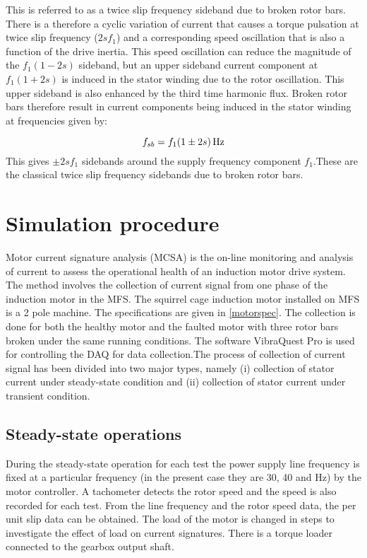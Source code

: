 \documentclass[a4paper,11pt]{report}
\begin{document}
This is referred to as a twice slip frequency sideband due to broken rotor bars. There is a therefore a cyclic variation of current that causes a torque pulsation at twice slip frequency ($2sf_{1}$) and a corresponding speed oscillation that is also a function of the drive inertia. This speed oscillation can reduce the magnitude of the $f_{1}(1-2s)$ sideband, but an upper sideband current component at $f_{1}(1+2s)$ is induced in the stator winding due to the rotor oscillation. This upper sideband is also enhanced by the third time harmonic flux. Broken rotor bars therefore result in current components being induced in the stator winding at frequencies given by:

\begin{equation}
f_{sb}=\unit[f_{1}(1\pm2s)]{Hz} \label{sb}
\end{equation}
This gives $\pm2sf_{1}$ sidebands around the supply frequency component $f_{1}$.These are the classical twice slip frequency sidebands due to broken rotor bars.

\section{Simulation procedure}
Motor current signature analysis (MCSA) is the on-line monitoring and analysis of current to assess the operational health of an induction motor drive system. The method involves the collection of current signal from one phase of the induction motor in the MFS. The squirrel cage induction motor installed on MFS is a 2 pole machine. The specifications are given in \ref{motorspec}. The collection is done for both the healthy motor and the faulted motor with three rotor bars broken under the same running conditions. The software VibraQuest Pro is used for controlling the DAQ for data collection.The process of collection of current signal has been divided into two major types, namely (i) collection of stator current under steady-state condition and (ii) collection of stator current under transient condition.
 
\subsection{Steady-state operations} \label{sso}

During the steady-state operation for each test the power supply line frequency is fixed at a particular frequency (in the present case they are 30, 40 and \unit[50]{Hz}) by the motor controller. A tachometer detects the rotor speed and the speed is also recorded for each test. From the line frequency and the rotor speed data, the per unit slip data can be obtained. The load of the motor is changed in steps to investigate the effect of load on current signatures. There is a torque loader connected to the gearbox output shaft. 
\end{document}
